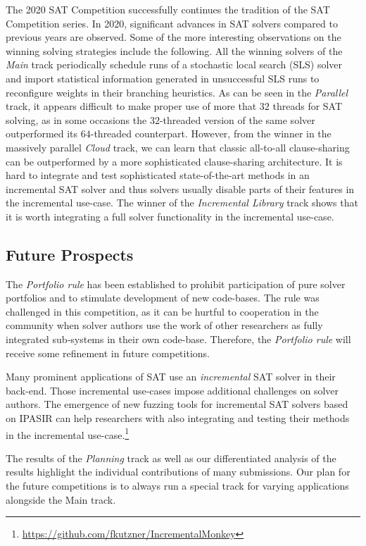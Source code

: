 \documentclass{elsarticle}
\begin{document}
The 2020 SAT Competition successfully continues the tradition of the SAT Competition series. In 2020, significant advances
in SAT solvers compared to previous years are observed. Some of the more interesting observations on the winning solving 
strategies include the following.
All the winning solvers of the \emph{Main} track periodically schedule runs of a stochastic local search (SLS)
solver and import statistical information generated in unsuccessful SLS runs to reconfigure weights in their branching heuristics. As can be seen in the \emph{Parallel} track, it appears difficult to make proper use of more that $32$ threads for SAT solving, as in some occasions the $32$-threaded version of the same solver outperformed its $64$-threaded counterpart. 
However, from the winner in the massively parallel \emph{Cloud} track, we can learn that classic all-to-all clause-sharing can be outperformed by a more sophisticated clause-sharing architecture. 
It is hard to integrate and test sophisticated state-of-the-art methods in an incremental SAT solver and thus solvers usually disable parts of their features in the incremental use-case. 
The winner of the \emph{Incremental Library} track shows that it is worth integrating a full solver functionality in the incremental use-case. 

\subsection*{Future Prospects}

The \emph{Portfolio rule} has been established to prohibit participation of pure solver portfolios and to stimulate development of new code-bases. 
The rule was challenged in this competition, as it can be hurtful to cooperation in the community when solver authors use the work of other researchers as fully integrated sub-systems in their own code-base. 
Therefore, the \emph{Portfolio rule} will receive some refinement in future competitions. 

Many prominent applications of SAT use an \emph{incremental} SAT solver in their back-end. 
Those incremental use-cases impose additional challenges on solver authors. 
The emergence of new fuzzing tools for incremental SAT solvers based on IPASIR can help researchers with also integrating and testing their methods in the incremental use-case.\footnote{\url{https://github.com/fkutzner/IncrementalMonkey}} 

The results of the \emph{Planning} track as well as our differentiated analysis of the results highlight the individual contributions of many submissions. 
Our plan for the future competitions is to always run a special track for varying applications alongside the Main track. 
\end{document}
